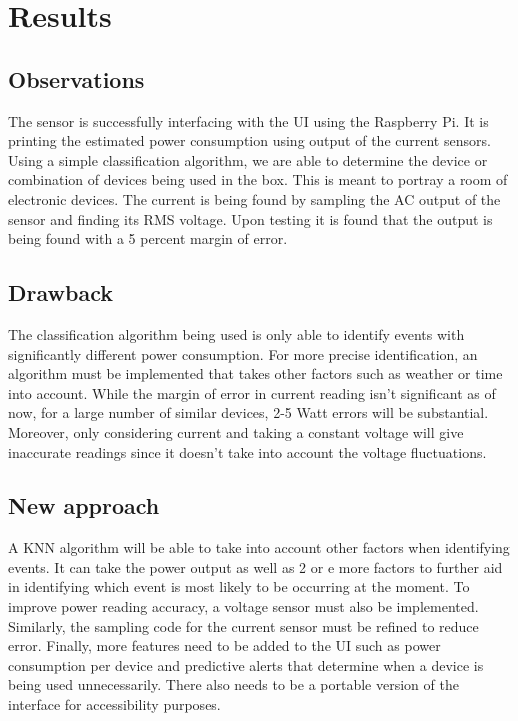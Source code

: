 \chapter{Results}
\section{Observations}
The sensor is successfully interfacing with the UI using the Raspberry Pi. It is printing the estimated power consumption using output of the current sensors. Using a simple classification algorithm, we are able to determine the device or combination of devices being used in the box. This is meant to portray a room of electronic devices.
The current is being found by sampling the AC output of the sensor and finding its RMS voltage. Upon testing it is found that the output is being found with a 5 percent margin of error.

\section{Drawback }
The classification algorithm being used is only able to identify events with significantly different power consumption. For more precise identification, an algorithm must be implemented that takes other factors such as weather or time into account.
While the margin of error in current reading isn't significant as of now, for a large number of similar devices, 2-5 Watt errors will be substantial. Moreover, only considering current and taking a constant voltage will give inaccurate readings since it doesn't take into account the voltage fluctuations.

\section{New approach}
A KNN algorithm will be able to take into account other factors when identifying events. It can take the power output as well as 2 or e more factors to further aid in identifying which event is most likely to be occurring at the moment.
To improve power reading accuracy, a voltage sensor must also be implemented. Similarly, the sampling code for the current sensor must be refined to reduce error.
Finally, more features need to be added to the UI such as power consumption per device and predictive alerts that determine when a device is being used unnecessarily. There also needs to be a portable version of the interface for accessibility purposes.